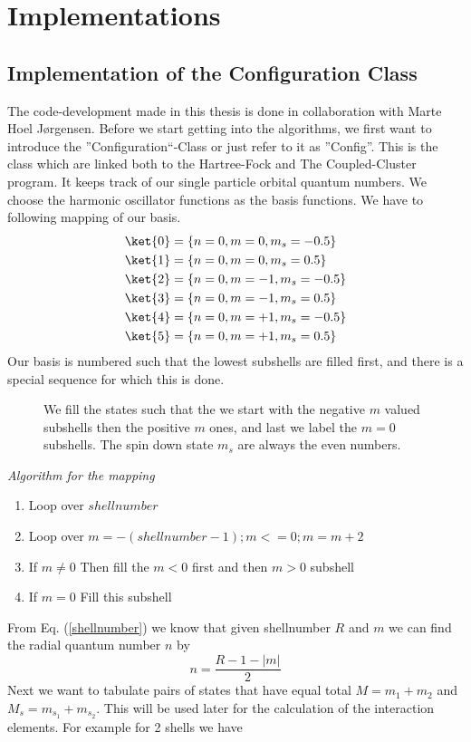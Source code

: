\chapter{Implementations}
\section{Implementation of the Configuration Class}
\label{config}
The code-development made in this thesis is done in collaboration with Marte Hoel J\o rgensen. Before we start getting into the algorithms, we first want to introduce the ''Configuration``-Class or just refer to it as ''Config''. This is the class which are linked both to the Hartree-Fock and The Coupled-Cluster program. It keeps track of our single particle orbital quantum numbers. We choose the harmonic oscillator functions as the basis functions. We have to following mapping of our basis. 
\begin{align*}
  \ket{0} & = \{n=0, m=0, m_s = -0.5\} \\ 
  \ket{1} & = \{n=0, m=0, m_s = 0.5\} \\
  \ket{2} & = \{n=0, m=-1, m_s = -0.5\} \\
  \ket{3} & = \{n=0, m=-1, m_s = 0.5\} \\
  \ket{4} & = \{n=0, m=+1, m_s = -0.5\} \\
  \ket{5} & = \{n=0, m=+1, m_s = 0.5\}   
\end{align*}
%
Our basis is numbered such that the lowest subshells are filled first, and there is a special sequence for which this is done. 
%
\begin{figure}[ht]
\centering
\scalebox{0.7}{}
\caption{We fill the states such that the we start with the negative $m$ valued subshells then the positive $m$ ones, and last we label the $m=0$ subshells. The spin down state $m_s$ are always the even numbers.}
\end{figure}
% 
\begin{algorithm}[ht]
\caption{\emph{Algorithm for the mapping}}
\begin{enumerate}
\item Loop over $shellnumber$
\item Loop over $m=-(shellnumber-1);m<=0; m = m+2$
\item If $m \neq 0$ Then fill the $m<0$ first and then $m>0$ subshell
\item If $m = 0$ Fill this subshell
\end{enumerate}
\end{algorithm}
%
From Eq. (\ref{shellnumber}) we know that given shellnumber $R$ and $m$ we can find the radial quantum number $n$ by
%
\begin{equation}
n = \frac{R - 1 - |m|}{2}
\label{radialquantum number}  
\end{equation}
%
Next we want to tabulate pairs of states that have equal total $M = m_1 + m_2$ and $M_s = m_{s_1} + m_{s_2}$. This will be used later for the calculation of the  interaction elements. For example for 2 shells we have 
 
